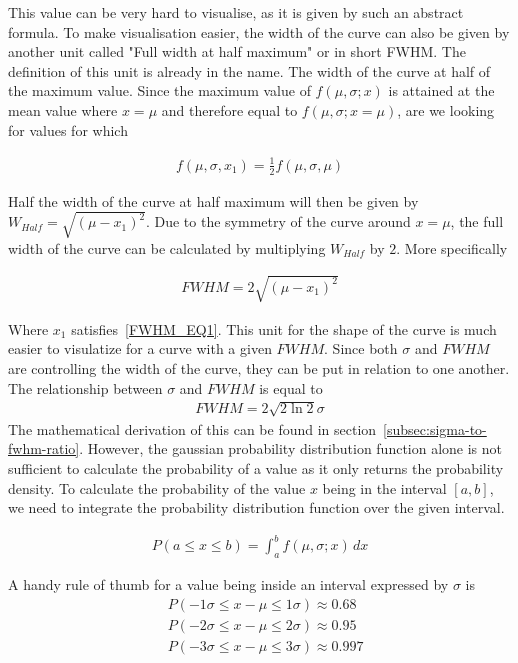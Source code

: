 \documentclass[reprint,english,notitlepage]{revtex4-2}
\begin{document}
This value can be very hard to visualise, as it is given by such an abstract formula.
To make visualisation easier, the width of the curve can also be given by another unit called "Full width at half maximum" or in short FWHM.
The definition of this unit is already in the name. The width of the curve at half of the maximum value.
Since the maximum value of $f(\mu, \sigma; x)$ is attained at the mean value where $x=\mu$ and therefore equal to $f(\mu, \sigma; x=\mu)$, are we looking for values for which

\begin{align}
    f(\mu, \sigma, x_1) = \frac{1}{2} f(\mu, \sigma, \mu) \label{FWHM_EQ1}
\end{align}

Half the width of the curve at half maximum will then be given by $W_{Half} = \sqrt{(\mu - x_1)^2}$.
Due to the symmetry of the curve around $x =\mu$, the full width of the curve can be calculated by multiplying $W_{Half}$ by $2$.
More specifically

\begin{align*}
    FWHM = 2\sqrt{(\mu - x_1)^2}
\end{align*}

Where $x_1$ satisfies~\ref{FWHM_EQ1}. This unit for the shape of the curve is much easier to visulatize for a curve with a given $FWHM$.
Since both $\sigma$ and $FWHM$ are controlling the width of the curve, they can be put in relation to one another.
The relationship between $\sigma$ and $FWHM$ is equal to
\begin{align*}
    FWHM = 2\sqrt{2\ln2}\sigma
\end{align*}
The mathematical derivation of this can be found in section~\ref{subsec:sigma-to-fwhm-ratio}.
However, the gaussian probability distribution function alone is not sufficient to calculate the probability of a value as it only returns the probability density.
To calculate the probability of the value $x$ being in the interval $[a, b]$, we need to integrate the probability distribution function over the given interval.

\begin{align*}
    P(a ≤ x ≤ b) = \int_{a}^{b} f(\mu, \sigma; x) \, dx
\end{align*}

A handy rule of thumb for a value being inside an interval expressed by $\sigma$ is
\begin{align*}
    &P(-1\sigma ≤ x-\mu ≤ 1\sigma) ≈ 0.68\\
	&P(-2\sigma ≤ x-\mu ≤ 2\sigma) ≈ 0.95\\
	&P(-3\sigma ≤ x-\mu ≤ 3\sigma) ≈ 0.997
\end{align*}
\end{document}
